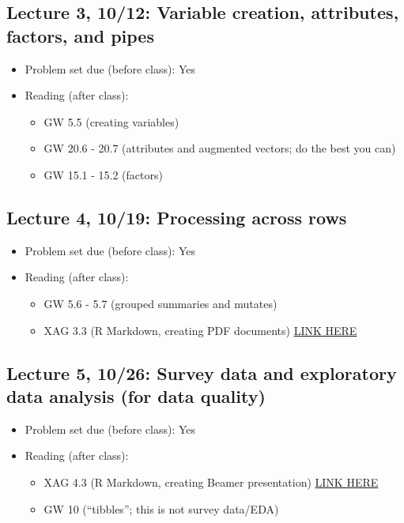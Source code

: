 \documentclass[11pt,]{article}
\providecommand{\tightlist}{%
  \setlength{\itemsep}{0pt}\setlength{\parskip}{0pt}}
\begin{document}
\subsection{Lecture 3, 10/12: Variable creation, attributes, factors,
and
pipes}\label{lecture-3-1012-variable-creation-attributes-factors-and-pipes}

\begin{itemize}
\tightlist
\item
  Problem set due (before class): Yes
\item
  Reading (after class):

  \begin{itemize}
  \tightlist
  \item
    GW 5.5 (creating variables)
  \item
    GW 20.6 - 20.7 (attributes and augmented vectors; do the best you
    can)\\
  \item
    GW 15.1 - 15.2 (factors)
  \end{itemize}
\end{itemize}

\subsection{Lecture 4, 10/19: Processing across
rows}\label{lecture-4-1019-processing-across-rows}

\begin{itemize}
\tightlist
\item
  Problem set due (before class): Yes
\item
  Reading (after class):

  \begin{itemize}
  \tightlist
  \item
    GW 5.6 - 5.7 (grouped summaries and mutates)
  \item
    XAG 3.3 (R Markdown, creating PDF documents)
    \href{https://bookdown.org/yihui/rmarkdown/pdf-document.html}{LINK
    HERE}
  \end{itemize}
\end{itemize}

\subsection{Lecture 5, 10/26: Survey data and exploratory data analysis
(for data
quality)}\label{lecture-5-1026-survey-data-and-exploratory-data-analysis-for-data-quality}

\begin{itemize}
\tightlist
\item
  Problem set due (before class): Yes
\item
  Reading (after class):

  \begin{itemize}
  \tightlist
  \item
    XAG 4.3 (R Markdown, creating Beamer presentation)
    \href{https://bookdown.org/yihui/rmarkdown/beamer-presentation.html}{LINK
    HERE}
  \item
    GW 10 (``tibbles''; this is not survey data/EDA)
  \end{itemize}
\end{itemize}
\end{document}
